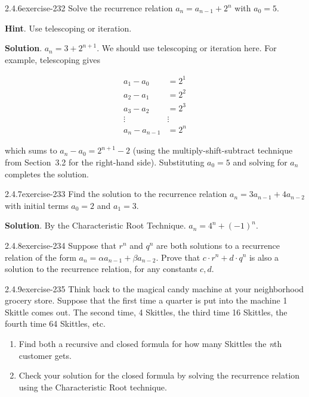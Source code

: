 \documentclass[twoside,11pt,]{book}
\numberwithin{equation}{chapter}
\newcommand{\amp}{&}
\begin{document}
\begin{divisionsolution}{2.4.6}{}{exercise-232}%
\hypertarget{p-3444}{}%
Solve the recurrence relation \(a_n = a_{n-1} + 2^n\) with \(a_0 = 5\text{.}\)%
\par\smallskip%
\noindent\textbf{Hint}.\quad%
\hypertarget{p-3445}{}%
Use telescoping or iteration.%
\par\smallskip%
\noindent\textbf{Solution}.\quad%
\hypertarget{p-3446}{}%
\(a_n = 3 + 2^{n+1}\text{.}\) We should use telescoping or iteration here. For example, telescoping gives%
\par
\hypertarget{p-3447}{}%
%
\begin{equation*}
\begin{aligned}
a_1 - a_0 \amp = 2^1\\
a_2 - a_1 \amp = 2^2\\
a_3 - a_2 \amp = 2^3\\
\vdots\amp \vdots\\
a_n - a_{n-1} \amp = 2^n
\end{aligned}
\end{equation*}
%
\par
\hypertarget{p-3448}{}%
which sums to \(a_n - a_0 = 2^{n+1} - 2\) (using the multiply-shift-subtract technique from Section~3.2 for the right-hand side). Substituting \(a_0 = 5\) and solving for \(a_n\) completes the solution.%
\end{divisionsolution}%
\begin{divisionsolution}{2.4.7}{}{exercise-233}%
\hypertarget{p-3451}{}%
Find the solution to the recurrence relation \(a_n = 3a_{n-1} + 4a_{n-2}\) with initial terms \(a_0 = 2\) and \(a_1 = 3\text{.}\)%
\par\smallskip%
\noindent\textbf{Solution}.\quad%
\hypertarget{p-3452}{}%
By the Characteristic Root Technique. \(a_n = 4^n + (-1)^n\text{.}\)%
\end{divisionsolution}%
\begin{divisionsolution}{2.4.8}{}{exercise-234}%
\hypertarget{p-3453}{}%
Suppose that \(r^n\) and \(q^n\) are both solutions to a recurrence relation of the form \(a_n = \alpha a_{n-1} + \beta a_{n-2}\). Prove that \(c\cdot r^n + d \cdot q^n\) is also a solution to the recurrence relation, for any constants \(c, d\).%
\end{divisionsolution}%
\begin{divisionsolution}{2.4.9}{}{exercise-235}%
\hypertarget{p-3454}{}%
Think back to the magical candy machine at your neighborhood grocery store. Suppose that the first time a quarter is put into the machine 1 Skittle comes out. The second time, 4 Skittles, the third time 16 Skittles, the fourth time 64 Skittles, etc.\leavevmode%
\begin{enumerate}[label=(\alph*)]
\item\hypertarget{li-1944}{}\hypertarget{p-3455}{}%
Find both a recursive and closed formula for how many Skittles the \emph{n}th customer gets.%
\item\hypertarget{li-1945}{}\hypertarget{p-3456}{}%
Check your solution for the closed formula by solving the recurrence relation using the Characteristic Root technique.%
\end{enumerate}
%
\end{divisionsolution}%
\end{document}
